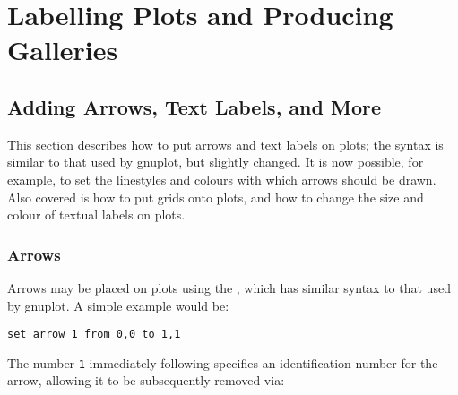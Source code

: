%
%
%
%
%



\chapter{Labelling Plots and Producing Galleries}

\section{Adding Arrows, Text Labels, and More}

This section describes how to put arrows and text labels on plots; the syntax
is similar to that used by gnuplot, but slightly changed. It is now possible,
for example, to set the linestyles and colours with which arrows should be
drawn.  Also covered is how to put grids onto plots, and how to change the size
and colour of textual labels on plots.

\subsection{Arrows}

\label{set_arrow} Arrows may be placed on plots using the
, which has similar syntax to that used by gnuplot. A simple
example would be:

\begin{verbatim}
set arrow 1 from 0,0 to 1,1
\end{verbatim}

\noindent The number {\tt 1} immediately following 
specifies an identification number for the arrow, allowing it to be
subsequently removed via:

